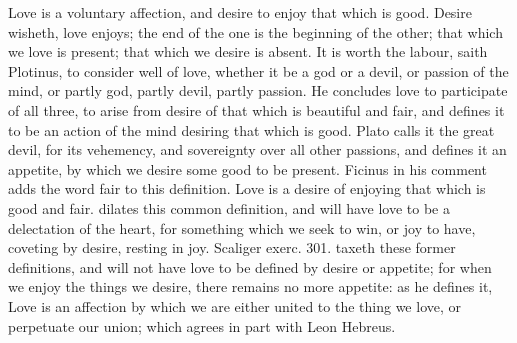 {Love is a voluntary affection, and desire to enjoy that which is
good. Desire wisheth, love enjoys; the end of the one is the
beginning of the other; that which we love is present; that which we
desire is absent. It is worth the labour, saith Plotinus, to
consider well of love, whether it be a god or a devil, or passion of
the mind, or partly god, partly devil, partly passion. He concludes
love to participate of all three, to arise from desire of that which is
beautiful and fair, and defines it to be an action of the mind desiring
that which is good. Plato calls it the great devil, for its
vehemency, and sovereignty over all other passions, and defines it an
appetite, by which we desire some good to be present. Ficinus in
his comment adds the word fair to this definition. Love is a desire of
enjoying that which is good and fair. \Austin{} dilates this common
definition, and will have love to be a delectation of the heart,
for something which we seek to win, or joy to have, coveting by
desire, resting in joy. Scaliger exerc. 301. taxeth these former
definitions, and will not have love to be defined by desire or
appetite; for when we enjoy the things we desire, there remains no more
appetite: as he defines it, Love is an affection by which we are either
united to the thing we love, or perpetuate our union; which agrees in
part with Leon Hebreus.

}
